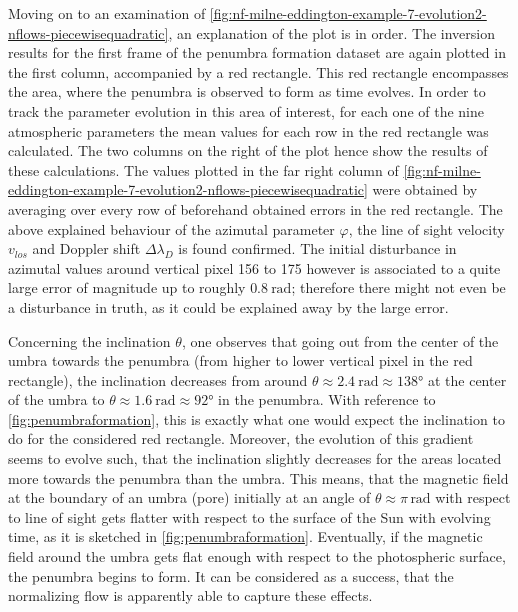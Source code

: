\documentclass[a4paper,12pt]{report}
\begin{document}
Moving on to an examination of \cref{fig:nf-milne-eddington-example-7-evolution2-nflows-piecewisequadratic}, an explanation of the plot is in order. The inversion results for the first frame of the penumbra formation dataset are again plotted in the first column, accompanied by a red rectangle. This red rectangle encompasses the area, where the penumbra is observed to form as time evolves. In order to track the parameter evolution in this area of interest, for each one of the nine atmospheric parameters the mean values for each row in the red rectangle was calculated. The two columns on the right of the plot hence show the results of these calculations. The values plotted in the far right column of \cref{fig:nf-milne-eddington-example-7-evolution2-nflows-piecewisequadratic} were obtained by averaging over every row of beforehand obtained errors in the red rectangle. The above explained behaviour of the azimutal parameter $\varphi$, the line of sight velocity $v_{los}$ and Doppler shift $\Delta \lambda_D$ is found confirmed. The initial disturbance in azimutal values around vertical pixel 156 to 175 however is associated to a quite large error of magnitude up to roughly $\SI{0.8}{\radian}$; therefore there might not even be a disturbance in truth, as it could be explained away by the large error.

Concerning the inclination $\theta$, one observes that going out from the center of the umbra towards the penumbra (from higher to lower vertical pixel in the red rectangle), the inclination decreases from around $\theta \approx \SI{2.4}{\radian} \approx \ang{138}$ at the center of the umbra to $\theta \approx \SI{1.6}{\radian} \approx \ang{92}$ in the penumbra. With reference to \cref{fig:penumbraformation}, this is exactly what one would expect the inclination to do for the considered red rectangle. Moreover, the evolution of this gradient seems to evolve such, that the inclination slightly decreases for the areas located more towards the penumbra than the umbra. This means, that the magnetic field at the boundary of an umbra (pore) initially at an angle of $\theta \approx \pi\,\si{\radian}$ with respect to line of sight gets flatter with respect to the surface of the Sun with evolving time, as it is sketched in \cref{fig:penumbraformation}. Eventually, if the magnetic field around the umbra gets flat enough with respect to the photospheric surface, the penumbra begins to form. It can be considered as a success, that the normalizing flow is apparently able to capture these effects.
\end{document}
